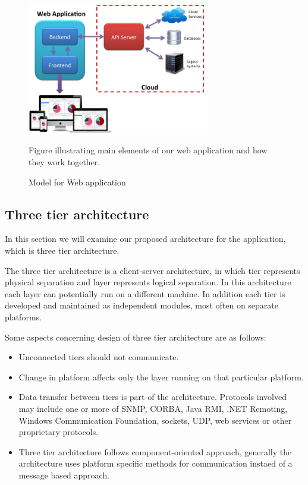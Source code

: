 \begin{figure} 
\centering
\includegraphics[width=8cm]{pictures/taxonomy.png}
\caption{Model for Web application}
Figure illustrating main elements of our web application and how they work together.
\label{fig:taxonomy}
\end{figure}

\subsection{Three tier architecture}
\label{sec:three_tier}
In this section we will examine our proposed architecture for the application, which is three tier architecture.

The three tier architecture is a client-server architecture, in which tier represents physical separation and layer represents logical separation.
In this architecture each layer can potentially run on a different machine. In addition each tier is developed and maintained as independent modules, most often on separate platforms. 

Some aspects concerning design of three tier architecture are as follows:
\begin{itemize}
    \item Unconnected tiers should not communicate.
    \item Change in platform affects only the layer running on that particular platform. 
    \item Data transfer between tiers is part of the architecture. Protocols involved may include one or more of SNMP, CORBA, Java RMI, .NET Remoting, Windows Communication Foundation, sockets, UDP, web services or other proprietary protocols.
    \item Three tier architecture follows component-oriented approach, generally the architecture uses platform specific methods for communication instaed of a message based approach.
\end{itemize}


